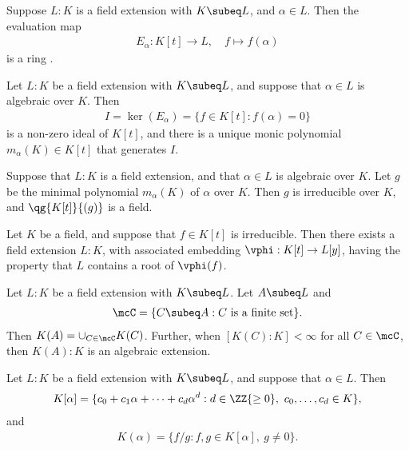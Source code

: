 \documentclass{article}
\begin{document}
  \begin{tproposition}
    Suppose \( L: K \) is a field extension with \( K\subeq L \), and \( \alpha\in L \). Then the evaluation map
    \begin{align*}
      E_\alpha: K[t] \to L,\quad f\mapsto f(\alpha)
    \end{align*}
    is a ring \homo.
  \end{tproposition}

  \begin{tproposition}
    Let \( L: K \) be a field extension with \( K\subeq L \), and suppose that \( \alpha\in L \) is algebraic over \( K \).
    Then
    \begin{align*}
      I = \ker(E_\alpha) = \{ f \in K[t] : f(\alpha) = 0 \}
    \end{align*}
    is a non-zero ideal of \( K[t] \), and there is a unique monic polynomial \( m_\alpha(K) \in K[t] \) that generates \( I \).
  \end{tproposition}

  \begin{ttheorem}
    Suppose that \( L:K \) is a field extension, and that \( \alpha\in L \) is algebraic over \( K \).
    Let \( g \) be the minimal polynomial \( m_\alpha(K) \) of \( \alpha \) over \( K \).
    Then \( g \) is irreducible over \( K \), and \( \qg{K[t]}{(g)} \) is a field.
  \end{ttheorem}

  \begin{ttheorem}
    Let \( K \) be a field, and suppose that \( f\in K[t] \) is irreducible.
    Then there exists a field extension \( L:K \), with associated embedding \( \vphi:K[t]\to L[y] \), having the property that \( L \) contains a root of \( \vphi(f) \).
  \end{ttheorem}

  \begin{tproposition}
    Let \( L:K \) be a field extension with \( K\subeq L \).
    Let \( A\subeq L \) and
    \begin{align*}
      \mcC=\{ C\subeq A : C \text{ is a finite set} \}.
    \end{align*}
    Then \( K(A)=\cup_{C\in\mcC}K(C) \). Further, when \( [K(C):K]<\infty \) for all \( C\in \mcC \), then \( K(A):K \) is an algebraic extension.
  \end{tproposition}

  \begin{tproposition}
    Let \( L:K \) be a field extension with \( K\subeq L \), and suppose that \( \alpha\in L \).
    Then
    \begin{align*}
      K[\alpha] = \{ c_0 + c_1\alpha+\cdots+c_d \alpha^d : d\in \ZZ{\geq 0},\ c_0,\ldots,c_d\in K \},
    \end{align*}
    and
    \begin{align*}
      K(\alpha) = \{ f/g : f,g\in K[\alpha],\ g\neq 0 \}.
    \end{align*}
  \end{tproposition}
\end{document}
